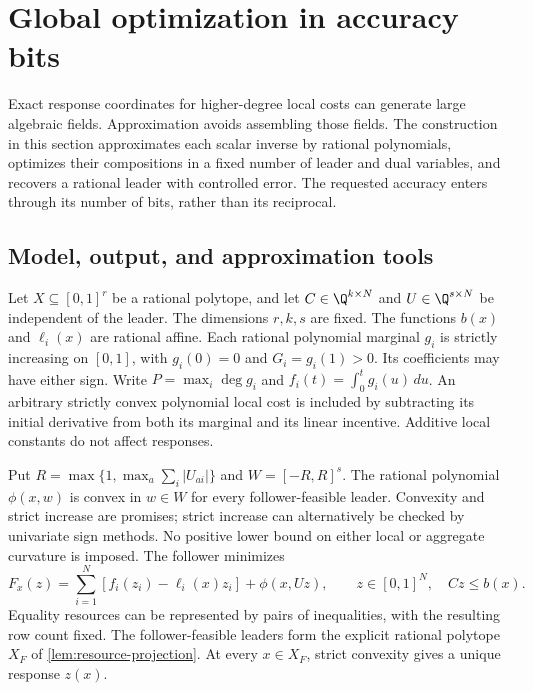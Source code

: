 \section{Global optimization in accuracy bits}\label{sec:accuracy}

Exact response coordinates for higher-degree local costs can generate
large algebraic fields. Approximation avoids assembling those fields.
The construction in this section approximates each scalar inverse by
rational polynomials, optimizes their compositions in a fixed number
of leader and dual variables, and recovers a rational leader with
controlled error. The requested accuracy enters through its number of
bits, rather than its reciprocal.

\subsection{Model, output, and approximation tools}\label{subsec:accuracy-model}

Let $X\subseteq[0,1]^r$ be a rational polytope, and let
$C\in\Q^{k\times N}$ and $U\in\Q^{s\times N}$ be independent of
the leader. The dimensions $r,k,s$ are fixed. The functions $b(x)$
and $\ell_i(x)$ are rational affine. Each rational polynomial marginal
$g_i$ is strictly increasing on $[0,1]$, with $g_i(0)=0$ and
$G_i=g_i(1)>0$. Its coefficients may have either sign. Write
$P=\max_i\deg g_i$ and $f_i(t)=\int_0^t g_i(u)\,du$.
An arbitrary strictly convex polynomial local cost is included by
subtracting its initial derivative from both its marginal and its
linear incentive. Additive local constants do not affect responses.

Put $R=\max\{1,\max_a\sum_i|U_{ai}|\}$ and
$W=[-R,R]^s$. The rational polynomial $\phi(x,w)$ is convex in
$w\in W$ for every follower-feasible leader. Convexity and strict
increase are promises; strict increase can alternatively be checked by
univariate sign methods. No positive lower bound on either local or
aggregate curvature is imposed. The follower minimizes
\begin{equation}\label{eq:accuracy-follower}
 F_x(z)=\sum_{i=1}^N[f_i(z_i)-\ell_i(x)z_i]+\phi(x,Uz),
 \qquad z\in[0,1]^N,\quad Cz\le b(x).
\end{equation}
Equality resources can be represented by pairs of inequalities, with
the resulting row count fixed. The follower-feasible leaders form the
explicit rational polytope $X_F$ of \cref{lem:resource-projection}.
At every $x\in X_F$, strict convexity gives a unique response $z(x)$.

